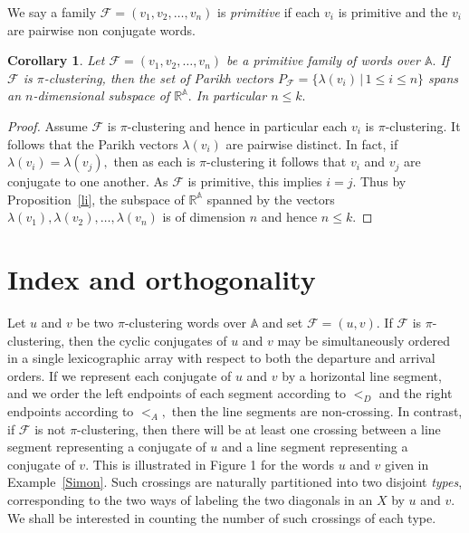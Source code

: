 \documentclass[12pt,a4paper]{amsart}
\newcommand{\reals}{{\mathbb R}}
\newcommand{\A}{{\mathbb A}}
\newtheorem{corollary}{Corollary}
\begin{document}
We say a family $\mathcal F=(v_1,v_2,\ldots ,v_n)$ is {\it primitive} if each $v_i$ is primitive and the $v_i$ are pairwise non conjugate words.

\begin{corollary}\label{span} Let $\mathcal F=(v_1,v_2,\ldots ,v_n)$ be a primitive family of words over $\A.$ If $\mathcal F$ is $\pi$-clustering, then the set of Parikh vectors  $P_{\mathcal F}= \{\lambda (v_i)\,|\,1\leq i\leq n\}$ spans an $n$-dimensional subspace of $\reals^\A.$  In particular $n\leq k.$ 
\end{corollary} 

\begin{proof} Assume $\mathcal F$ is $\pi$-clustering and hence in particular each $v_i$ is $\pi$-clustering. It follows that  the Parikh vectors $\lambda (v_i)$ are pairwise distinct. In fact,  if $\lambda (v_i)=\lambda (v_j),$ then as each is $\pi$-clustering it follows that $v_i$ and $v_j$ are conjugate to one another. As $\mathcal F$ is primitive, this implies $i=j.$   Thus by Proposition~\ref{li}, the subspace of $\reals^\A$ spanned by the vectors $\lambda (v_1),\lambda (v_2),\ldots,\lambda (v_n)$ is of dimension $n$ and hence $n\leq k.$\end{proof}


\section{Index and orthogonality}     

Let $u$ and $v$ be two $\pi$-clustering words over $\A$ and set  $\mathcal F=(u,v).$ If $\mathcal F$ is $\pi$-clustering, then the cyclic conjugates of $u$ and $v$ may be simultaneously ordered in a single lexicographic array with respect to both the departure and arrival orders. If we represent each conjugate of $u$ and $v$ by a horizontal line segment, and we order the left endpoints of each segment according to $<_D$ and the right endpoints according to $<_A,$ then the line segments are non-crossing. In contrast, if $\mathcal F$ is not $\pi$-clustering, then there will be at least one  crossing between a line segment representing a conjugate of $u$ and  a line segment representing a conjugate of $v.$  This is illustrated in Figure 1 for the words $u$ and $v$ given in Example~\ref{Simon}. Such crossings are naturally partitioned into two disjoint {\it types}, corresponding to the two ways of labeling the two diagonals in an $X$ by $u$ and $v.$ We shall be interested in counting the number of such crossings of each type. 
\end{document}
